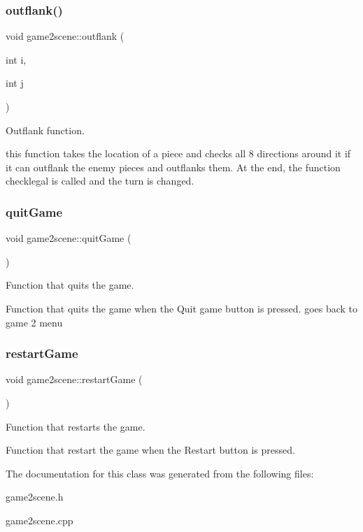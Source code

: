 \subsubsection{\texorpdfstring{outflank()}{outflank()}}
{\footnotesize\ttfamily void game2scene\+::outflank (\begin{DoxyParamCaption}\item[{int}]{i,  }\item[{int}]{j }\end{DoxyParamCaption})}



Outflank function. 

this function takes the location of a piece and checks all 8 directions around it if it can outflank the enemy pieces and outflanks them. At the end, the function checklegal is called and the turn is changed. \mbox{\label{classgame2scene_ab8f07d5d6dacd32de1ff442ee29f45d3}} 
\subsubsection{\texorpdfstring{quit\+Game}{quitGame}}
{\footnotesize\ttfamily void game2scene\+::quit\+Game (\begin{DoxyParamCaption}{ }\end{DoxyParamCaption})\hspace{0.3cm}{\ttfamily [slot]}}



Function that quits the game. 

Function that quits the game when the Quit game button is pressed. goes back to game 2 menu \mbox{\label{classgame2scene_a8b3ee51f004d034df994bd602a31ec5b}} 
\subsubsection{\texorpdfstring{restart\+Game}{restartGame}}
{\footnotesize\ttfamily void game2scene\+::restart\+Game (\begin{DoxyParamCaption}{ }\end{DoxyParamCaption})\hspace{0.3cm}{\ttfamily [slot]}}



Function that restarts the game. 

Function that restart the game when the Restart button is pressed. 

The documentation for this class was generated from the following files\+:\begin{DoxyCompactItemize}
\item 
game2scene.\+h\item 
game2scene.\+cpp\end{DoxyCompactItemize}
